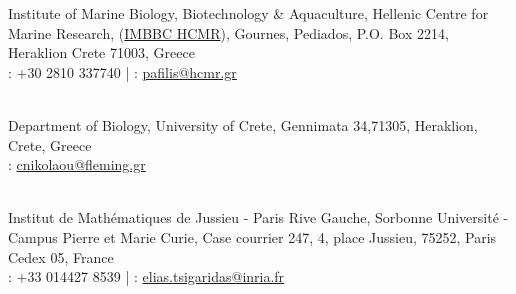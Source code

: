 \documentclass[
	a4paper,
]{fortysecondscv}
\begin{document}
\begin{cvtable}
	    {Institute of Marine Biology, Biotechnology \& Aquaculture, Hellenic Centre for Marine Research, ({\href{https://imbbc.hcmr.gr/}{IMBBC HCMR}}),
	    Gournes, Pediados, P.O. Box 2214, Heraklion Crete 71003, Greece \\ \faPhone: +30 2810 337740 | 
	    \faAt: \href{mailto:pafilis@hcmr.gr}{pafilis@hcmr.gr}}
	    
	\\
	    
	    {Department of Biology, University of Crete, Gennimata 34,71305, Heraklion, Crete, Greece \\ 
	    \faAt: \href{mailto:cnikolaou@fleming.gr}{cnikolaou@fleming.gr}}

    \\
    
	    {Institut de Mathématiques de Jussieu - Paris Rive Gauche, Sorbonne Université - Campus Pierre et Marie Curie, Case courrier 247, 4, place Jussieu, 75252, Paris Cedex 05, France \\ 
	    \faPhone: +33 014427 8539 | \faAt: \href{mailto: elias.tsigaridas@inria.fr}{elias.tsigaridas@inria.fr}}

\end{cvtable}



\makebacksidebar
\cvsignature
\end{document}
